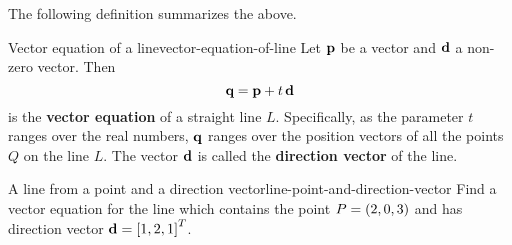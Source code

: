 \begin{center}
\end{center}
The following definition summarizes the above.

\begin{definition}{Vector equation of a line}{vector-equation-of-line}
  Let $\mbox{\bf p}$ be a vector and $\mbox{\bf d}$ a non-zero vector. Then
  \begin{equation*}
    \mbox{\bf q} = \mbox{\bf p} + t\,\mbox{\bf d}
  \end{equation*}
  is the \textbf{vector equation}%
   of a
  straight line $L$. Specifically, as the parameter $t$ ranges over
  the real numbers, $\mbox{\bf q}$ ranges over the position vectors of all
  the points $Q$ on the line $L$.  The vector $\mbox{\bf d}$ is called the
  \textbf{direction vector}%
   of the line.
\end{definition} 

\begin{example}{A line from a point and a direction vector}{line-point-and-direction-vector}
  Find a vector equation for the line which contains the point
  $P = \left(2,0,3\right)$ and has direction vector
  $\mbox{\bf d} = \left[1,2,1\right]^T$.
\end{example}

